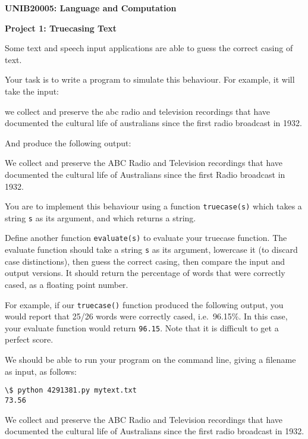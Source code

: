 \documentclass[a4paper,10pt]{article}
\begin{document}
\centerline{\LARGE\bf UNIB20005: Language and Computation}\vspace{2ex}

\centerline{\large\bf Project 1: Truecasing Text}\vspace{2ex}
\vfil

Some text and speech input applications are able to guess the correct casing of text.

Your task is to write a program to simulate this behaviour. For example, it will take
the input:
\begin{blockquote}
we collect and preserve the abc radio and television recordings that have documented the cultural life of australians since the first radio broadcast in 1932.
\end{blockquote}

And produce the following output:

\begin{blockquote}
We collect and preserve the ABC Radio and Television recordings that have documented the cultural life of Australians since the first Radio broadcast in 1932.
\end{blockquote}

You are to implement this behaviour using a function \texttt{truecase(s)} which takes a string \texttt{s} as its argument, and which returns a string.

Define another function \texttt{evaluate(s)} to evaluate your truecase function.
The evaluate function should take a string \texttt{s} as its argument, lowercase it (to discard case distinctions),
then guess the correct casing, then compare the input and output versions. It should return the percentage of
words that were correctly cased, as a floating point number.

For example, if our \texttt{truecase()} function produced the following output, you would report that 25/26 words were
correctly cased, i.e.\ 96.15\%. In this case, your evaluate function would return \texttt{96.15}.
Note that it is difficult to get a perfect score.

We should be able to run your program on the command line, giving a filename as input, as follows:

\begin{verbatim}
\$ python 4291381.py mytext.txt
73.56
\end{verbatim}

\begin{blockquote}
We collect and preserve the ABC Radio and Television recordings that have documented the cultural life of Australians since the first radio broadcast in 1932.
\end{blockquote}
\end{document}
